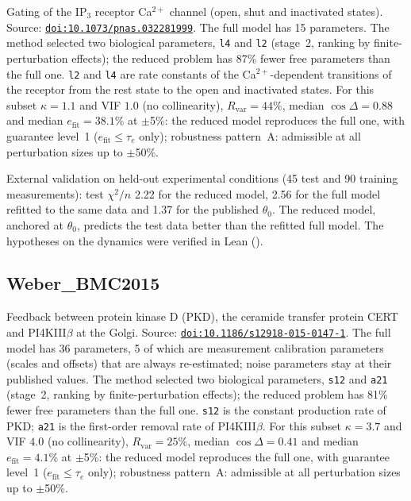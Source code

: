 Gating of the IP$_3$ receptor Ca$^{2+}$ channel (open, shut and inactivated states). Source: \href{https://doi.org/10.1073/pnas.032281999}{\nolinkurl{doi:10.1073/pnas.032281999}}. The full model has 15 parameters. The method selected two biological parameters, \texttt{l4} and \texttt{l2} (stage~2, ranking by finite-perturbation effects); the reduced problem has 87\% fewer free parameters than the full one. \texttt{l2} and \texttt{l4} are rate constants of the Ca$^{2+}$-dependent transitions of the receptor from the rest state to the open and inactivated states. For this subset $\kappa=1.1$ and VIF $1.0$ (no collinearity), $R_{\mathrm{var}}=44\%$, median $\cos\Delta=0.88$ and median $e_{\mathrm{fit}}=38.1\%$ at $\pm$5\%: the reduced model reproduces the full one, with guarantee level~1 ($e_{\mathrm{fit}}\le\tau_e$ only); robustness pattern~A: admissible at all perturbation sizes up to $\pm$50\%.

External validation on held-out experimental conditions (45 test and 90 training measurements): test $\chi^2/n$ 2.22 for the reduced model, 2.56 for the full model refitted to the same data and 1.37 for the published $\theta_0$. The reduced model, anchored at $\theta_0$, predicts the test data better than the refitted full model. The hypotheses on the dynamics were verified in Lean ().

\subsection*{Weber\_BMC2015}

Feedback between protein kinase D (PKD), the ceramide transfer protein CERT and PI4KIII$\beta$ at the Golgi. Source: \href{https://doi.org/10.1186/s12918-015-0147-1}{\nolinkurl{doi:10.1186/s12918-015-0147-1}}. The full model has 36 parameters, 5 of which are measurement calibration parameters (scales and offsets) that are always re-estimated; noise parameters stay at their published values. The method selected two biological parameters, \texttt{s12} and \texttt{a21} (stage~2, ranking by finite-perturbation effects); the reduced problem has 81\% fewer free parameters than the full one. \texttt{s12} is the constant production rate of PKD; \texttt{a21} is the first-order removal rate of PI4KIII$\beta$. For this subset $\kappa=3.7$ and VIF $4.0$ (no collinearity), $R_{\mathrm{var}}=25\%$, median $\cos\Delta=0.41$ and median $e_{\mathrm{fit}}=4.1\%$ at $\pm$5\%: the reduced model reproduces the full one, with guarantee level~1 ($e_{\mathrm{fit}}\le\tau_e$ only); robustness pattern~A: admissible at all perturbation sizes up to $\pm$50\%.

